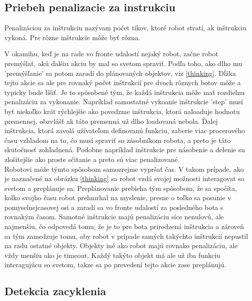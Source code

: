 \subsection{Priebeh penalizacie za instrukciu}
\begin{definicia}
Penalizáciou za inštrukciu nazývam počet tikov, ktoré robot stratí, ak inštrukciu vykoná. Pre rôzne inštrukcie môže byť rôzna.
\end{definicia}
\indent
V okamihu, keď je na rade vo fronte udalostí nejaký robot, začne robot premýšlať, akú ďalšiu akciu by mal so svetom spraviť. Podľa toho, ako dlho mu 'premýšľanie' sa potom zaradí do plánovaných objektov, viz \ref{thinking}. Dĺžka tejto akcie sa ale pre rovnaký počet inštrukcií pre dvoch rôznych botov môže a typicky bude líšiť. Je to spôsobené tým, že každá inštrukcia môže mať rozdielnu penalizáciu za vykonanie. Napríklad samostatné vykoanie inštrukcie 'step' musí byť niekoľko krát rýchlejšie ako povedzme inštrukcia, ktorá naloaduje hodnotu premennej, obzvlášť ak táto premenná už dlho loadovaná nebola. Ďalej inštrukcia, ktorá zavolá užívateľom definovanú funkciu, zaberie viac procerového času vzhladom na to, ćo musí spraviť so zásobníkom robota, a preto je táto skutočnosť zohľadnená. Podobne napríklad inštrukcie pre násobenie a delenie su zlošitejšie ako proste sčitanie a preto sú viac penalizované.\\
\indent
Robotovi môže týmto spôsobom samozrejme vypršať čas. V takom prípade, ako je naznačené na obrázku \ref{thinking} sa robot vzdá svojej možnosti interagovat so svetom a preplánuje sa. Preplánovanie prebieha tým spôsobom, že sa spočíta, kolko svojho času robot prehmrhal na myslenie, presne o toľko sa posunie v pomyselnejcasovej osi a zaradí sa vo fronte udalostí za posledného bota s rovnakým časom. Samotné inštrukcie majú penalizáciu síce nenulovú, ale najmenšiu, čo odpovedá tomu, že je to pre bota prirodzená inštrukcia a zároveň sa tým zamedzuje tomu, aby robot v prípade samých takýchto inštrukcií nepustil na radu ostatné objekty. Objekty iné ako robot majú rovnako penalizáciu, ale vždy menšiu ako je timeout. Každý takýto objekt má ale už iba funkciu interagujúcu so svetom, takze sa po prevedení tejto akcie zase preplánujú.


\subsection{Detekcia zacyklenia}

